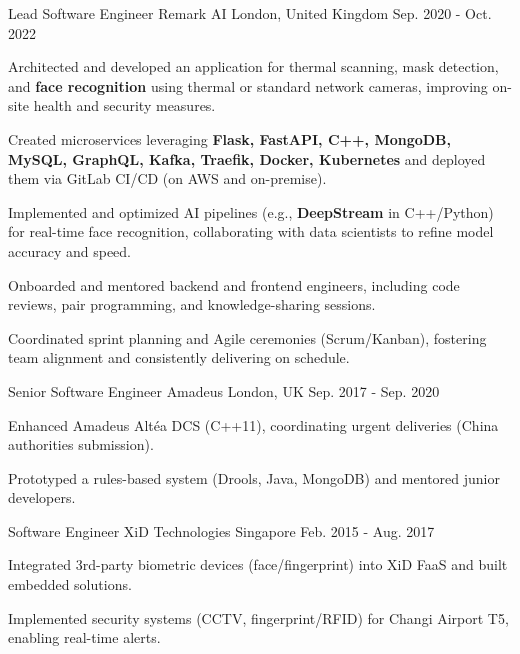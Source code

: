 \begin{cventries}
   \cventry
    {Lead Software Engineer} %
    {Remark AI} %
    {London,  United Kingdom} %
    {Sep. 2020 - Oct. 2022} %
    {
      \begin{cvitems}
        \item {Architected and developed an application for thermal scanning, mask detection, and \textbf{face recognition} using thermal or standard network cameras, improving on-site health and security measures.}
        \item {Created microservices leveraging \textbf{Flask, FastAPI, C++, MongoDB, MySQL, GraphQL, Kafka, Traefik, Docker, Kubernetes} and deployed them via GitLab CI/CD (on AWS and on-premise).}
        \item {Implemented and optimized AI pipelines (e.g., \textbf{DeepStream} in C++/Python) for real-time face recognition, collaborating with data scientists to refine model accuracy and speed.}
        \item {Onboarded and mentored backend and frontend engineers, including code reviews, pair programming, and knowledge-sharing sessions.}
        \item {Coordinated sprint planning and Agile ceremonies (Scrum/Kanban), fostering team alignment and consistently delivering on schedule.}
      \end{cvitems}
    }
\cventry
  {Senior Software Engineer} %
  {Amadeus} %
  {London, UK} %
  {Sep. 2017 - Sep. 2020} %
  {
    \begin{cvitems}
      \item {Enhanced Amadeus Altéa DCS (C++11), coordinating urgent deliveries (China authorities submission).}
      \item {Prototyped a rules-based system (Drools, Java, MongoDB) and mentored junior developers.}
    \end{cvitems}
  }

\cventry
  {Software Engineer} %
  {XiD Technologies} %
  {Singapore} %
  {Feb. 2015 - Aug. 2017} %
  {
    \begin{cvitems}
      \item {Integrated 3rd-party biometric devices (face/fingerprint) into XiD FaaS and built embedded solutions.}
      \item {Implemented security systems (CCTV, fingerprint/RFID) for Changi Airport T5, enabling real-time alerts.}
    \end{cvitems}
  }


\end{cventries}
